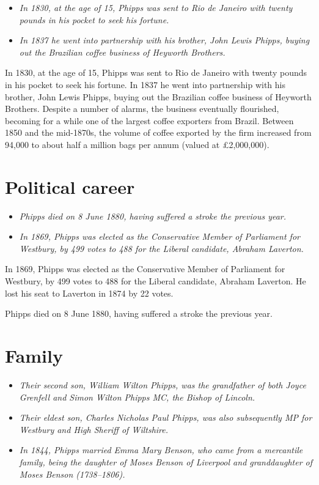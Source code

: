 \begin{itemize}
\item
  \emph{In 1830, at the age of 15, Phipps was sent to Rio de Janeiro
  with twenty pounds in his pocket to seek his fortune.}
\item
  \emph{In 1837 he went into partnership with his brother, John Lewis
  Phipps, buying out the Brazilian coffee business of Heyworth
  Brothers.}
\end{itemize}

In 1830, at the age of 15, Phipps was sent to Rio de Janeiro with twenty
pounds in his pocket to seek his fortune. In 1837 he went into
partnership with his brother, John Lewis Phipps, buying out the
Brazilian coffee business of Heyworth Brothers. Despite a number of
alarms, the business eventually flourished, becoming for a while one of
the largest coffee exporters from Brazil. Between 1850 and the
mid-1870s, the volume of coffee exported by the firm increased from
94,000 to about half a million bags per annum (valued at £2,000,000).

\section{Political career}\label{political-career}

\begin{itemize}
\item
  \emph{Phipps died on 8 June 1880, having suffered a stroke the
  previous year.}
\item
  \emph{In 1869, Phipps was elected as the Conservative Member of
  Parliament for Westbury, by 499 votes to 488 for the Liberal
  candidate, Abraham Laverton.}
\end{itemize}

In 1869, Phipps was elected as the Conservative Member of Parliament for
Westbury, by 499 votes to 488 for the Liberal candidate, Abraham
Laverton. He lost his seat to Laverton in 1874 by 22 votes.

Phipps died on 8 June 1880, having suffered a stroke the previous year.

\section{Family}\label{family}

\begin{itemize}
\item
  \emph{Their second son, William Wilton Phipps, was the grandfather of
  both Joyce Grenfell and Simon Wilton Phipps MC, the Bishop of
  Lincoln.}
\item
  \emph{Their eldest son, Charles Nicholas Paul Phipps, was also
  subsequently MP for Westbury and High Sheriff of Wiltshire.}
\item
  \emph{In 1844, Phipps married Emma Mary Benson, who came from a
  mercantile family, being the daughter of Moses Benson of Liverpool and
  granddaughter of Moses Benson (1738--1806).}
\end{itemize}

